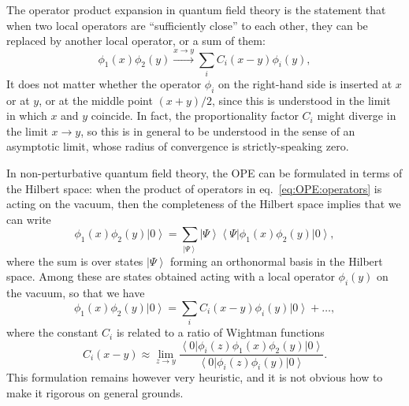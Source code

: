 \documentclass[a4paper,12pt]{article}
\newcommand{\ket}[1]{\left| #1 \right\rangle}
\newcommand{\bra}[1]{\left\langle #1 \right|}
\numberwithin{equation}{section}
\begin{document}
The operator product expansion in quantum field theory is the statement that when two local operators are ``sufficiently close'' to each other, they can be replaced by another local operator, or a sum of them:
\begin{equation}
	\phi_1(x) \phi_2(y) \xrightarrow{x \to y} \sum_i C_i(x-y) \phi_i(y),
	\label{eq:OPE:operators}
\end{equation}
It does not matter whether the operator $\phi_i$ on the right-hand side is inserted at $x$ or at $y$, or at the middle point $(x+y)/2$, since this is understood in the limit in which $x$ and $y$ coincide. In fact, the proportionality factor $C_i$ might diverge in the limit $x \to y$, so this is in general to be understood in the sense of an asymptotic limit, whose radius of convergence is strictly-speaking zero.

In non-perturbative quantum field theory, the OPE can be formulated in terms of the Hilbert space: when the product of operators in eq.~\eqref{eq:OPE:operators} is acting on the vacuum, then the completeness of the Hilbert space implies that we can write
\begin{equation}
	\phi_1(x) \phi_2(y) \ket{0}
	= \sum_{\ket{\Psi}} \ket{\Psi}
	\bra{\Psi} \phi_1(x) \phi_2(y) \ket{0},
\end{equation}
where the sum is over states $\ket{\Psi}$ forming an orthonormal basis in the Hilbert space. Among these are states obtained acting with a local operator $\phi_i(y)$ on the vacuum, so that we have 
\begin{equation}
	\phi_1(x) \phi_2(y) \ket{0}
	= \sum_{i} C_i(x-y) \phi_i(y) \ket{0} + \ldots,
\end{equation}
where the constant $C_i$ is related to a ratio of Wightman functions
\begin{equation}
	C_i(x-y) \approx \lim_{z \to y}
	\frac{\bra{0} \phi_i(z) \phi_1(x) \phi_2(y) \ket{0}}
	{\bra{0} \phi_i(z) \phi_i(y) \ket{0}}.
\end{equation}
This formulation remains however very heuristic, and it is not obvious how to make it rigorous on general grounds.
\end{document}
